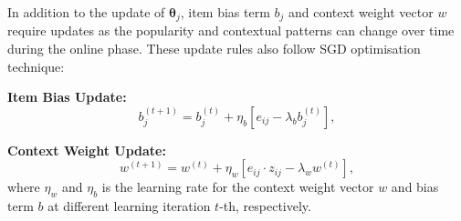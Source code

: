 \documentclass[acmsmall]{acmart}
\begin{document}
In addition to the update of $\boldsymbol{\theta}_j$, item bias term $b_j$ and context weight vector $w$ require updates as the popularity and contextual patterns can change over time during the online phase. These update rules also follow SGD optimisation technique: 


\textbf{Item Bias Update:}
\begin{equation}
b_j^{(t+1)} = b_j^{(t)} + \eta_b \left[e_{ij} - \lambda_b b_j^{(t)}\right],
\end{equation}

\textbf{Context Weight Update:}
\begin{equation}
w^{(t+1)} = w^{(t)} + \eta_w \left[e_{ij} \cdot z_{ij} - \lambda_w w^{(t)}\right],
\end{equation}
where $\eta_w$ and $\eta_b$ is the learning rate for the context weight vector $w$ and bias term $b$ at different learning iteration $t$-th, respectively.

\end{document}

